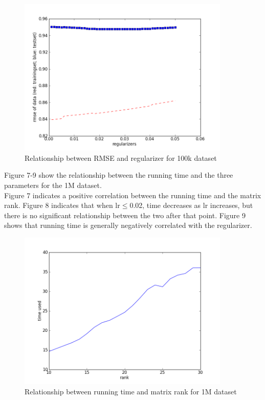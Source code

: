 \documentclass[12pt]{article}
\begin{document}
\begin{figure}[H]
\centering
\includegraphics[width=0.90\textwidth]{smallrmsereg.png}
\caption{Relationship between RMSE and regularizer for 100k dataset}
\end{figure}

\noindent Figure 7-9 show the relationship between the running time and the three parameters
for the 1M dataset.\\

\noindent Figure 7 indicates a positive correlation between the running time
and the matrix rank. Figure 8 indicates that when lr$\leq$0.02, time decreases
as lr increases, but there is no significant relationship between the two after that point.
Figure 9 shows that running time is generally negatively correlated with the regularizer.

\begin{figure}[H]
\centering
\includegraphics[width=0.90\textwidth]{bigtimerank.png}
\caption{Relationship between running time and matrix rank for 1M dataset}
\end{figure}
\end{document}
